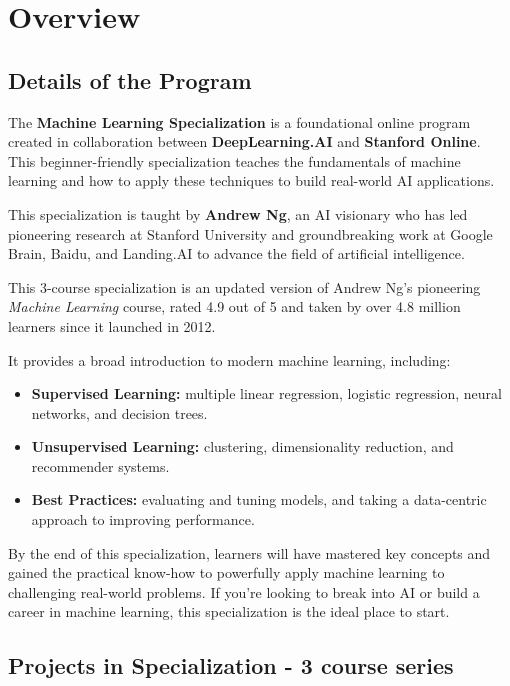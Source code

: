 \section{Overview}

\subsection{Details of the Program}

\indent\indent The \textbf{Machine Learning Specialization} is a foundational online program created in collaboration between \textbf{DeepLearning.AI} and \textbf{Stanford Online}. 
This beginner-friendly specialization teaches the fundamentals of machine learning and how to apply these techniques to build real-world AI applications.

This specialization is taught by \textbf{Andrew Ng}, an AI visionary who has led pioneering research at Stanford University and groundbreaking work at Google Brain, Baidu, and Landing.AI to advance the field of artificial intelligence.

This 3-course specialization is an updated version of Andrew Ng’s pioneering \emph{Machine Learning} course, rated 4.9 out of 5 and taken by over 4.8 million learners since it launched in 2012.

It provides a broad introduction to modern machine learning, including:
\begin{itemize}
    \item \textbf{Supervised Learning:} multiple linear regression, logistic regression, neural networks, and decision trees.
    \item \textbf{Unsupervised Learning:} clustering, dimensionality reduction, and recommender systems.
    \item \textbf{Best Practices:} evaluating and tuning models, and taking a data-centric approach to improving performance.
\end{itemize}

\noindent By the end of this specialization, learners will have mastered key concepts and gained the practical know-how to powerfully apply machine learning to challenging real-world problems. 
If you’re looking to break into AI or build a career in machine learning, this specialization is the ideal place to start.

\subsection{Projects in Specialization - 3 course series}

